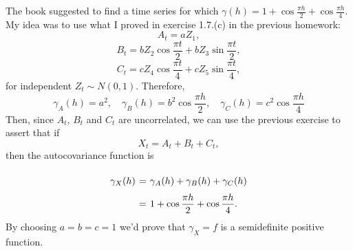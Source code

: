 The book suggested to find a time series for which $\gamma(h) = 1 + \cos \frac{\pi h}{2} + \cos \frac{\pi h}{4}$. My idea was to use what I proved in exercise 1.7.(c) in the previous homework:
\[ A_t = a Z_1, \]
\[ B_t = b Z_2 \cos \frac{\pi t}{2} + b Z_3 \sin \frac{\pi t}{2},  \]
\[ C_t = c Z_4 \cos \frac{\pi t}{4} + c Z_5 \sin \frac{\pi t}{4}, \]
for independent $Z_t \sim N(0,1)$. Therefore,
\[ \gamma_A(h) = a^2,\hspace{1em}\gamma_B(h) = b^2 \cos \frac{\pi h}{2},\hspace{1em} \gamma_C(h) =  c^2 \cos \frac{\pi h}{4}  \]
Then, since $A_t$, $B_t$ and $C_t$ are uncorrelated, we can use the previous exercise to assert that if
\[ X_t = A_t + B_t + C_t,\]
then the autocovariance function is
\[ \everymath{\displaystyle}
\arraycolsep=1.8pt\def\arraystretch{2}
\begin{array}{rcl}
    \gamma_X(h) & = & \gamma_A(h) + \gamma_B(h) + \gamma_C(h)\\
    & = & 1 + \cos \frac{\pi h}{2} + \cos \frac{\pi h}{4}.
\end{array}\]
By choosing $a = b = c = 1$ we'd prove that $\gamma_X = f$ is a semidefinite positive function.
